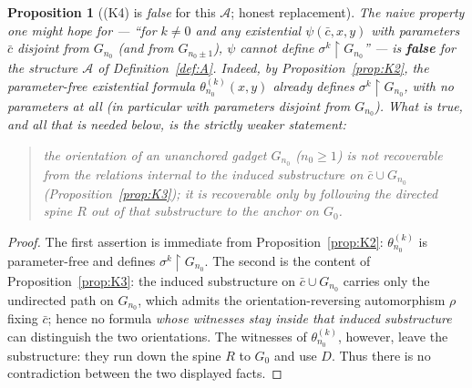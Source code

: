 \documentclass[12pt,fullpage]{article}
\newtheorem{proposition}[theorem]{Proposition}
\theoremstyle{definition}
\newcommand{\A}{\mathcal{A}}
\begin{document}
\begin{proposition}[(K4) is \emph{false} for this $\A$; honest replacement]\label{prop:K4}
The naive property one might hope for --- ``for $k\ne0$ and any existential
$\psi(\bar c,x,y)$ with parameters $\bar c$ disjoint from $G_{n_0}$ (and from
$G_{n_0\pm1}$), $\psi$ cannot define $\sigma^k\restriction G_{n_0}$'' --- is
\textbf{false} for the structure $\A$ of Definition~\ref{def:A}.  Indeed, by
Proposition~\ref{prop:K2}, the parameter-free existential formula
$\theta_{n_0}^{(k)}(x,y)$ already defines $\sigma^k\restriction G_{n_0}$, with
no parameters at all (in particular with parameters disjoint from $G_{n_0}$).
What \emph{is} true, and all that is needed below, is the strictly weaker
statement:
\begin{quote}
the orientation of an unanchored gadget $G_{n_0}$ ($n_0\ge1$) is not
recoverable from the relations \emph{internal} to the induced substructure on
$\bar c\cup G_{n_0}$ (Proposition~\ref{prop:K3}); it is recoverable only by
following the directed spine $R$ out of that substructure to the anchor on
$G_0$.
\end{quote}
\end{proposition}

\begin{proof}
The first assertion is immediate from Proposition~\ref{prop:K2}:
$\theta_{n_0}^{(k)}$ is parameter-free and defines $\sigma^k\restriction
G_{n_0}$.  The second is the content of Proposition~\ref{prop:K3}: the induced
substructure on $\bar c\cup G_{n_0}$ carries only the undirected path on
$G_{n_0}$, which admits the orientation-reversing automorphism $\rho$ fixing
$\bar c$; hence no formula \emph{whose witnesses stay inside that induced
substructure} can distinguish the two orientations.  The witnesses of
$\theta_{n_0}^{(k)}$, however, leave the substructure: they run down the spine
$R$ to $G_0$ and use $D$.  Thus there is no contradiction between the two
displayed facts.
\end{proof}
\end{document}
